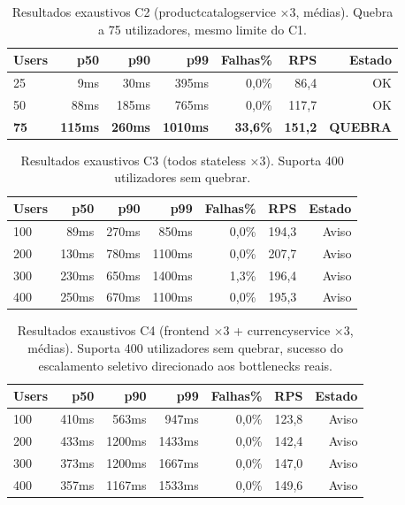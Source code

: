 \documentclass[manuscript,screen,review]{acmart}
\begin{document}
\begin{table}[t]
\caption{Resultados exaustivos C2 (productcatalogservice ×3, médias). Quebra a 75 utilizadores, mesmo limite do C1.}
\label{tab:c2ex}
\begin{tabular}{lrrrrrr}
\toprule
\textbf{Users} & \textbf{p50} & \textbf{p90} & \textbf{p99} & \textbf{Falhas\%} & \textbf{RPS} & \textbf{Estado} \\
\midrule
25 & 9ms & 30ms & 395ms & 0,0\% & 86,4 & OK \\
50 & 88ms & 185ms & 765ms & 0,0\% & 117,7 & OK \\
\textbf{75} & \textbf{115ms} & \textbf{260ms} & \textbf{1010ms} & \textbf{33,6\%} & \textbf{151,2} & \textbf{QUEBRA} \\
\bottomrule
\end{tabular}
\end{table}

\begin{table}[t]
\caption{Resultados exaustivos C3 (todos stateless ×3). Suporta 400 utilizadores sem quebrar.}
\label{tab:c3ex}
\begin{tabular}{lrrrrrr}
\toprule
\textbf{Users} & \textbf{p50} & \textbf{p90} & \textbf{p99} & \textbf{Falhas\%} & \textbf{RPS} & \textbf{Estado} \\
\midrule
100 & 89ms & 270ms & 850ms & 0,0\% & 194,3 & Aviso \\
200 & 130ms & 780ms & 1100ms & 0,0\% & 207,7 & Aviso \\
300 & 230ms & 650ms & 1400ms & 1,3\% & 196,4 & Aviso \\
400 & 250ms & 670ms & 1100ms & 0,0\% & 195,3 & Aviso \\
\bottomrule
\end{tabular}
\end{table}

\begin{table}[t]
\caption{Resultados exaustivos C4 (frontend ×3 + currencyservice ×3, médias). Suporta 400 utilizadores sem quebrar, sucesso do escalamento seletivo direcionado aos bottlenecks reais.}
\label{tab:c4ex}
\begin{tabular}{lrrrrrr}
\toprule
\textbf{Users} & \textbf{p50} & \textbf{p90} & \textbf{p99} & \textbf{Falhas\%} & \textbf{RPS} & \textbf{Estado} \\
\midrule
100 & 410ms & 563ms & 947ms & 0,0\% & 123,8 & Aviso \\
200 & 433ms & 1200ms & 1433ms & 0,0\% & 142,4 & Aviso \\
300 & 373ms & 1200ms & 1667ms & 0,0\% & 147,0 & Aviso \\
400 & 357ms & 1167ms & 1533ms & 0,0\% & 149,6 & Aviso \\
\bottomrule
\end{tabular}
\end{table}
\end{document}

